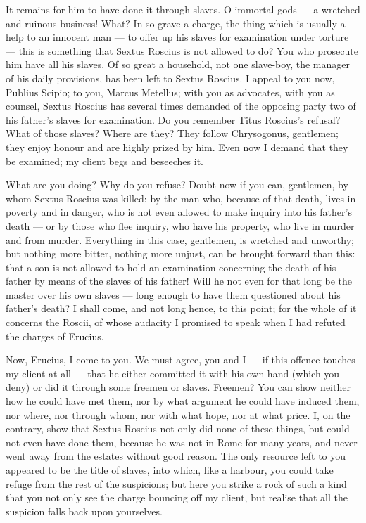  It remains for him to have done it through slaves. O immortal gods --- a wretched and ruinous business! What? In so grave a charge, the thing which is usually a help to an innocent man --- to offer up his slaves for examination under torture --- this is something that Sextus Roscius is not allowed to do? You who prosecute him have all his slaves. Of so great a household, not one slave-boy, the manager of his daily provisions, has been left to Sextus Roscius. I appeal to you now, Publius Scipio; to you, Marcus Metellus; with you as advocates, with you as counsel, Sextus Roscius has several times demanded of the opposing party two of his father's slaves for examination. Do you remember Titus Roscius's refusal? What of those slaves? Where are they? They follow Chrysogonus, gentlemen; they enjoy honour and are highly prized by him. Even now I demand that they be examined; my client begs and beseeches it.

 What are you doing? Why do you refuse? Doubt now if you can, gentlemen, by whom Sextus Roscius was killed: by the man who, because of that death, lives in poverty and in danger, who is not even allowed to make inquiry into his father's death --- or by those who flee inquiry, who have his property, who live in murder and from murder. Everything in this case, gentlemen, is wretched and unworthy; but nothing more bitter, nothing more unjust, can be brought forward than this: that a son is not allowed to hold an examination concerning the death of his father by means of the slaves of his father! Will he not even for that long be the master over his own slaves --- long enough to have them questioned about his father's death? I shall come, and not long hence, to this point; for the whole of it concerns the Roscii, of whose audacity I promised to speak when I had refuted the charges of Erucius.

 Now, Erucius, I come to you. We must agree, you and I --- if this offence touches my client at all --- that he either committed it with his own hand (which you deny) or did it through some freemen or slaves. Freemen? You can show neither how he could have met them, nor by what argument he could have induced them, nor where, nor through whom, nor with what hope, nor at what price. I, on the contrary, show that Sextus Roscius not only did none of these things, but could not even have done them, because he was not in Rome for many years, and never went away from the estates without good reason. The only resource left to you appeared to be the title of slaves, into which, like a harbour, you could take refuge from the rest of the suspicions; but here you strike a rock of such a kind that you not only see the charge bouncing off my client, but realise that all the suspicion falls back upon yourselves.

